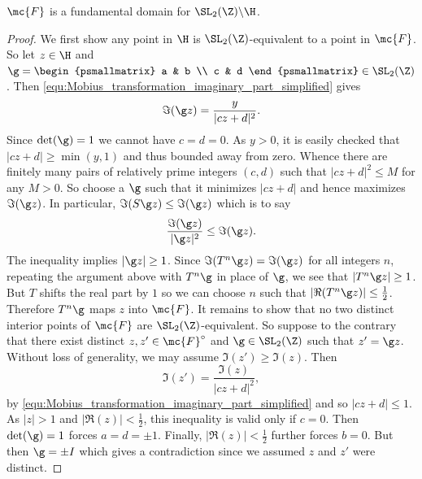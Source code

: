 \documentclass[12pt]{article}
\begin{document}
      \begin{proposition}\label{prop:fundamental_domain_modular_group}
        \(\mc{F}\) is a fundamental domain for \(\SL_{2}(\Z)\backslash\H\).
      \end{proposition}
      \begin{proof}
        We first show any point in \(\H\) is \(\SL_{2}(\Z)\)-equivalent to a point in \(\mc{F}\). So let \(z \in \H\) and \(\g = \begin{psmallmatrix} a & b \\ c & d \end{psmallmatrix} \in \SL_{2}(\Z)\). Then \cref{equ:Mobius_transformation_imaginary_part_simplified} gives
        \[
          \Im(\g z) = \frac{y}{|cz+d|^{2}}.
        \]
        Since \(\det(\g) = 1\) we cannot have \(c = d = 0\). As \(y > 0\), it is easily checked that \(|cz+d| \ge \min(y,1)\) and thus bounded away from zero. Whence there are finitely many pairs of relatively prime integers \((c,d)\) such that \(|cz+d|^{2} \le M\) for any \(M > 0\). So choose a \(\g\) such that it minimizes \(|cz+d|\) and hence maximizes \(\Im(\g z)\). In particular, \(\Im(S\g z) \le \Im(\g z)\) which is to say
        \[
          \frac{\Im(\g z)}{|\g z|^{2}} \le \Im(\g z).
        \]
        The inequality implies \(|\g z| \ge 1\). Since \(\Im(T^{n}\g z) = \Im(\g z)\) for all integers \(n\), repeating the argument above with \(T^{n}\g\) in place of \(\g\), we see that \(|T^{n}\g z| \ge 1\). But \(T\) shifts the real part by \(1\) so we can choose \(n\) such that \(|\Re(T^{n}\g z)| \le \frac{1}{2}\). Therefore \(T^{n}\g\) maps \(z\) into \(\mc{F}\). It remains to show that no two distinct interior points of \(\mc{F}\) are \(\SL_{2}(\Z)\)-equivalent. So suppose to the contrary that there exist distinct \(z,z' \in \mc{F}^{\circ}\) and \(\g \in \SL_{2}(\Z)\) such that \(z' = \g z\). Without loss of generality, we may assume \(\Im(z') \ge \Im(z)\). Then
        \[
          \Im(z') = \frac{\Im(z)}{|cz+d|^{2}},
        \]
        by \cref{equ:Mobius_transformation_imaginary_part_simplified} and so \(|cz+d| \le 1\). As \(|z| > 1\) and \(|\Re(z)| < \frac{1}{2}\), this inequality is valid only if \(c = 0\). Then \(\det(\g) = 1\) forces \(a = d = \pm 1\). Finally, \(|\Re(z)| < \frac{1}{2}\) further forces \(b = 0\). But then \(\g = \pm I\) which gives a contradiction since we assumed \(z\) and \(z'\) were distinct.
      \end{proof}
\end{document}
